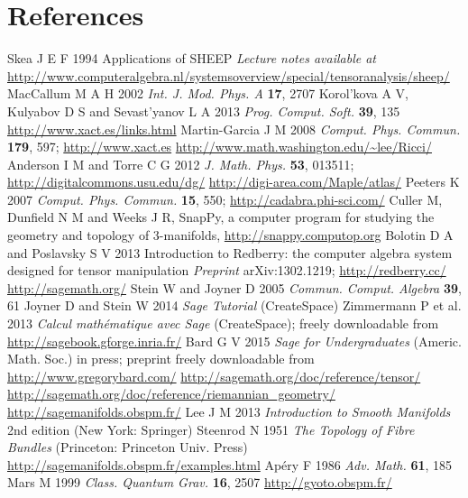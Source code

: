 \documentclass[a4paper]{jpconf}
\begin{document}
\section*{References}
\begin{thebibliography}{10}
Skea J E F 1994 Applications of SHEEP {\it Lecture notes available at}
\url{
http://www.computeralgebra.nl/systemsoverview/special/tensoranalysis/sheep/}
MacCallum M A H 2002 {\it Int. J. Mod. Phys. A} {\bf 17}, 2707 
Korol'kova A V, Kulyabov D S and Sevast'yanov L A 2013 {\it Prog. Comput. Soft.} 
{\bf 39}, 135
\url{http://www.xact.es/links.html}
Martin-Garcia J M 2008 {\it Comput. Phys. Commun.} {\bf 179}, 597; 
\url{http://www.xact.es}
\url{http://www.math.washington.edu/~lee/Ricci/}
Anderson I M and Torre C G 2012 {\it J. Math. Phys.} {\bf 53}, 013511; 
\url{http://digitalcommons.usu.edu/dg/}
\url{http://digi-area.com/Maple/atlas/}
Peeters K 2007 {\it Comput. Phys. Commun.} {\bf 15}, 550;
\url{http://cadabra.phi-sci.com/}
Culler M, Dunfield N M and Weeks J R, SnapPy, a computer program for studying the geometry and topology of 3-manifolds, \url{http://snappy.computop.org}
Bolotin D A and Poslavsky S V 2013 Introduction to Redberry: the computer algebra system designed for tensor manipulation {\it Preprint} arXiv:1302.1219;
\url{http://redberry.cc/}
\url{http://sagemath.org/}
Stein W and Joyner D 2005 {\it Commun. Comput. Algebra} {\bf 39}, 61
Joyner D and Stein W 2014 {\it Sage Tutorial} (CreateSpace)
Zimmermann P et al. 2013 {\it Calcul math\'ematique avec Sage} (CreateSpace); 
freely downloadable from \url{http://sagebook.gforge.inria.fr/}
Bard G V 2015 {\it Sage for Undergraduates} (Americ. Math. Soc.) in press;
preprint freely downloadable from \url{http://www.gregorybard.com/}
\url{http://sagemath.org/doc/reference/tensor/}
\url{http://sagemath.org/doc/reference/riemannian_geometry/}
\url{http://sagemanifolds.obspm.fr/}
Lee J M 2013 {\it Introduction to Smooth Manifolds} 2nd edition (New York: Springer)
Steenrod N 1951 {\it The Topology of Fibre Bundles} (Princeton: Princeton Univ. Press)
\url{http://sagemanifolds.obspm.fr/examples.html}
Ap\'ery F 1986 {\it Adv. Math.} {\bf 61}, 185
Mars M 1999 {\it Class. Quantum Grav.} {\bf 16}, 2507
\url{http://gyoto.obspm.fr/}
\end{thebibliography}
\end{document}
